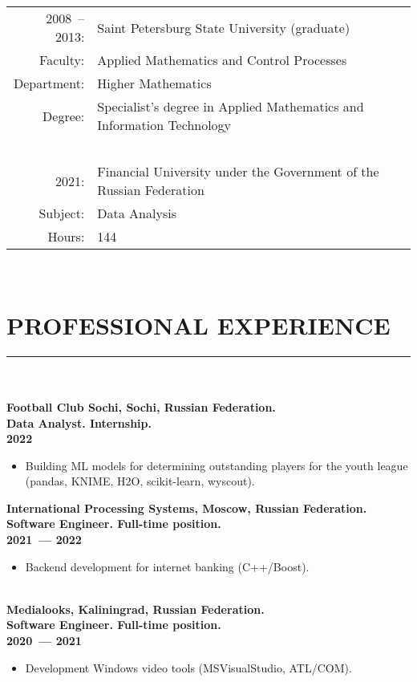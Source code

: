 \documentclass[a4paper,oneside,12pt]{article}
\newcommand{\cvpart}[1]{%
\vspace{-0.9em}%
\section*{\Large\bfseries\MakeTextUppercase{#1}}%
\vspace{-1.7em}%
\rule{\linewidth}{0.3em}\\[-0.8em]%
}
\begin{document}
\begin{tabularx}{\textwidth}{rX}
  2008~-- 2013:& Saint Petersburg State University (graduate)\\
       Faculty:& Applied Mathematics and Control Processes\\
    Department:& Higher Mathematics\\
        Degree:& Specialist's degree in Applied Mathematics and Information Technology\\  

    &~\\[1em]

          2021:& Financial University under the Government of the Russian Federation  \\
       Subject:& Data Analysis \\ 
         Hours:& 144
\end{tabularx}

~\\

\pagebreak


\cvpart{Professional Experience}

~\\[-1em]

{\bf
Football Club Sochi, Sochi, Russian Federation. \\ 
Data Analyst. Internship.\\
2022
}
\begin{itemize}
    \item Building ML models for determining outstanding players for the youth league (pandas, KNIME, H2O, scikit-learn, wyscout).
\end{itemize}

{\bf
International Processing Systems, Moscow, Russian Federation. \\
Software Engineer. Full-time position.\\
2021~--- 2022
}
\begin{itemize}
    \item Backend  development for internet banking (C++/Boost).
\end{itemize}

~\\[-1em]

{\bf
Medialooks, Kaliningrad, Russian Federation. \\
Software Engineer. Full-time position.\\
2020~--- 2021
}
\begin{itemize}
    \item Development Windows video tools (MSVisualStudio, ATL/COM).
\end{itemize}
\end{document}
